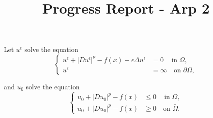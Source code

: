 \documentclass[english,reqno]{amsart}
\title{Progress Report - Arp 2}
\begin{document}
\maketitle
Let $u^\epsilon$ solve the equation
\begin{equation}
\left\{
  \begin{aligned}
    u^\epsilon + |Du^\epsilon|^p -f(x) - \epsilon \Delta u^\epsilon &=0 \quad \, \text{in } \Omega, \\
            u^\epsilon &= \infty \quad \text{on } \partial \Omega,
  \end{aligned}
\right.
\end{equation}

and $u_0$ solve the equation
\begin{equation}
\left\{
  \begin{aligned}
    u_0 + |Du_0|^p -f(x) &\leq 0 \quad \, \text{in } \Omega, \\
             u_0 + |Du_0|^p -f(x) &\geq 0 \quad \text{on } \bar{\Omega}.
  \end{aligned}
\right.
\end{equation}
\end{document}
